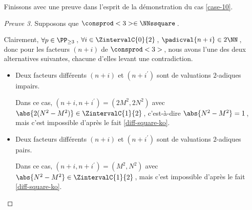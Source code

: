 

Finissons avec une preuve dans l'esprit de la démonstration du cas \ref{case-10}.


\begin{proof}[Preuve 3]%
    Supposons que $\consprod<3> \in \NNssquare$\,.
    
    \smallskip
    
    Clairement, 
    $\forall p \in \PP_{\geq 3}$\,, 
    $\forall i \in \ZintervalC{0}{2}$\,, 
    $\padicval{n + i} \in 2 \NN$\,,
    donc pour les facteurs $(n + i)$ de $\consprod<3>$\,, nous avons l'une des deux alternatives suivantes, chacune d'elles levant une contradiction.
    \begin{itemize}
    	\medskip
		\item Deux facteurs différents $(n+i)$ et $(n+i^\prime)$ sont de valuations $2$-adiques impairs.
		
		\smallskip
		\noindent
		Dans ce cas, $(n+i, n+i^\prime) = (2 M^2, 2 N^2)$ avec $\abs{2(N^2 - M^2)} \in \ZintervalC{1}{2}$\,, c'est-à-dire $\abs{N^2 - M^2} = 1$\,, mais c'est impossible d'après le fait \ref{diff-square-ko}.


    	\medskip
		\item Deux facteurs différents $(n+i)$ et $(n+i^\prime)$ sont de valuations $2$-adiques pairs.
		
		\smallskip
		\noindent
		Dans ce cas, $(n+i, n+i^\prime) = (M^2, N^2)$ avec $\abs{N^2 - M^2} \in \ZintervalC{1}{2}$\,, mais c'est impossible d'après le fait \ref{diff-square-ko}.
		\qedhere
    \end{itemize}
\end{proof}

